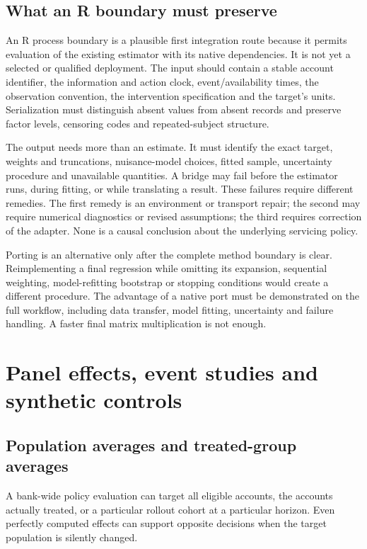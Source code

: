 \section{What an R boundary must preserve}

An R process boundary is a plausible first integration route because it permits
evaluation of the existing estimator with its native dependencies. It is not
yet a selected or qualified deployment. The input should contain a stable
account identifier, the information and action clock, event/availability
times, the observation convention, the intervention specification and the
target's units. Serialization must distinguish absent values from absent
records and preserve factor levels, censoring codes and repeated-subject
structure.

The output needs more than an estimate. It must identify the exact target,
weights and truncations, nuisance-model choices, fitted sample, uncertainty
procedure and unavailable quantities. A bridge may fail before the estimator
runs, during fitting, or while translating a result. These failures require
different remedies. The first remedy is an environment or transport repair;
the second may require numerical diagnostics or revised assumptions; the
third requires correction of the adapter. None is a causal conclusion about
the underlying servicing policy.

Porting is an alternative only after the complete method boundary is clear.
Reimplementing a final regression while omitting its expansion, sequential
weighting, model-refitting bootstrap or stopping conditions would create a
different procedure. The advantage of a native port must be demonstrated on
the full workflow, including data transfer, model fitting, uncertainty and
failure handling. A faster final matrix multiplication is not enough.

\chapter{Panel effects, event studies and synthetic controls}
\label{sw:panels}

\section{Population averages and treated-group averages}

A bank-wide policy evaluation can target all eligible accounts, the accounts
actually treated, or a particular rollout cohort at a particular horizon.
Even perfectly computed effects can support opposite decisions when the target
population is silently changed.

